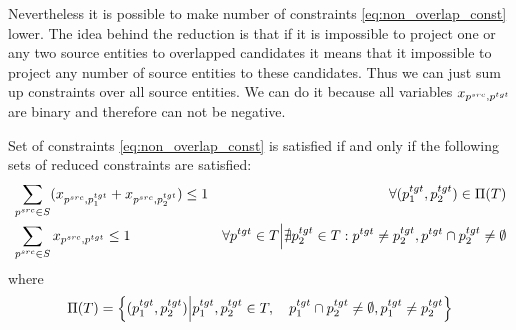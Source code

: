 Nevertheless it is possible to make number of constraints \eqref{eq:non_overlap_const} lower.
The idea behind the reduction is that if it is impossible to project one or any two source entities to
overlapped candidates it means that it impossible to project any number of source entities to these candidates.
Thus we can just sum up constraints over all source entities.
We can do it because all variables \( x_{p^{src}, p^{tgt}} \) are binary and therefore
can not be negative.
\begin{theorem}
  Set of constraints \eqref{eq:non_overlap_const} is satisfied if and only if
  the following sets of reduced constraints are satisfied:
  \begin{align*}
    & \sum\limits_{p^{src} \in S} (x_{p^{src}, p_1^{tgt}} + x_{p^{src}, p_2^{tgt}}) \leq 1                                & \forall (p_1^{tgt}, p_2^{tgt}) \in \Pi(T) \\
    & \sum\limits_{p^{src} \in S} x_{p^{src}, p^{tgt}} \leq 1
    & \forall p^{tgt} \in T \Big| \nexists p_2^{tgt} \in T: p^{tgt} \neq p_2^{tgt}, p^{tgt} \cap p_2^{tgt} \neq \emptyset                                             \\
  \end{align*}
  where
  \begin{equation*}
    \Pi(T) = \left\{ (p_1^{tgt}, p_2^{tgt}) \Big| p_1^{tgt}, p_2^{tgt} \in T,
      \quad p_1^{tgt} \cap p_2^{tgt} \neq \emptyset,
    p_1^{tgt} \neq p_2^{tgt} \right\}
  \end{equation*}
\end{theorem}
